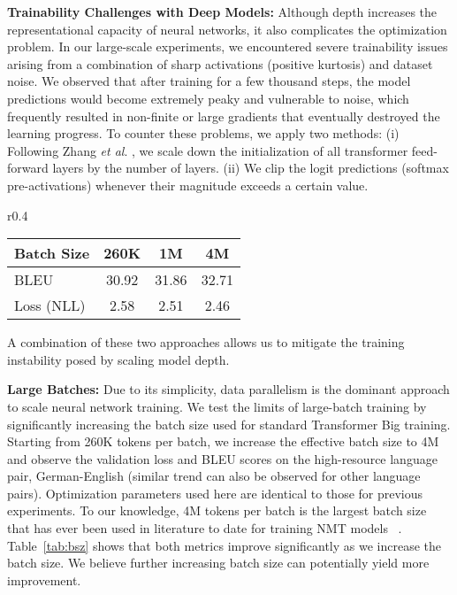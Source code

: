 \documentclass{article}
\def\onedot{.}
\def\etal{\emph{et al}\onedot}
\begin{document}
\textbf{Trainability Challenges with Deep Models:} Although depth increases the representational capacity of neural networks, it also complicates the optimization problem. In our large-scale experiments, we encountered severe trainability issues arising from a combination of sharp activations (positive kurtosis) and dataset noise. We observed that after training for a few thousand steps, the model predictions would become extremely peaky and vulnerable to noise, which frequently resulted in non-finite or large gradients that eventually destroyed the learning progress. To counter these problems, we apply two methods: (i) Following Zhang \etal{} \cite{zhang2019fixup}, we scale down the initialization of all transformer feed-forward layers by the number of layers. (ii) We clip the logit predictions (softmax pre-activations) whenever their magnitude exceeds a certain value. 
 \begin{wraptable}{r}{0.4\textwidth} 
\begin{center}
\caption{The Effect of Batch Size}
\label{tab:bsz}
\begin{tabular}{l|ccc}
\toprule
    Batch Size     & 260K  & 1M    & 4M    \\ \hline
    BLEU       & 30.92 & 31.86 & 32.71 \\
    Loss (NLL) & 2.58  & 2.51  & 2.46 \\    
\bottomrule    
\end{tabular}
\end{center}
\end{wraptable}
A combination of these two approaches allows us to mitigate the training instability posed by scaling model depth.

\textbf{Large Batches:} Due to its simplicity, data parallelism is the dominant approach to scale neural network training\cite{DBLP:journals/corr/KeskarMNST16, DBLP:journals/corr/abs-1711-00489}. We test the limits of large-batch training by significantly increasing the batch size used for standard Transformer Big training. Starting from 260K tokens per batch, we increase the effective batch size to 4M and observe the validation loss and BLEU scores on the high-resource language pair, German-English (similar trend can also be observed for other language pairs). Optimization parameters used here are identical to those for previous experiments. 
To our knowledge, 4M tokens per batch is the largest batch size that has ever been used in literature to date for training NMT models ~\cite{ott-etal-2018-scaling}. Table~\ref{tab:bsz} shows that both metrics improve significantly as we increase the batch size. We believe further increasing batch size can potentially yield more improvement.
\end{document}
